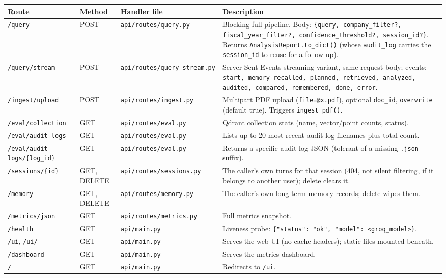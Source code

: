 \documentclass[11pt,a4paper]{report}
\newcommand{\code}[1]{\texttt{#1}}
\newcommand{\file}[1]{\texttt{\small #1}}
\begin{document}
\begin{longtable}{@{}p{2.6cm}p{1.1cm}p{3.6cm}p{6cm}@{}}
\toprule
\textbf{Route} & \textbf{Method} & \textbf{Handler file} & \textbf{Description} \\
\midrule
\endhead
\code{/query} & POST & \file{api/routes/query.py} & Blocking full pipeline. Body:
\code{\{query, company\_filter?, fiscal\_year\_filter?, confidence\_threshold?,
session\_id?\}}. Returns \code{AnalysisReport.to\_dict()} (whose
\code{audit\_log} carries the \code{session\_id} to reuse for a follow-up). \\
\code{/query/stream} & POST & \file{api/routes/query\_stream.py} & Server-Sent-Events
streaming variant, same request body; events: \code{start, memory\_recalled,
planned, retrieved, analyzed, audited, compared, remembered, done, error}. \\
\code{/ingest/upload} & POST & \file{api/routes/ingest.py} & Multipart PDF upload
(\code{file=@x.pdf}), optional \code{doc\_id}, \code{overwrite} (default true).
Triggers \code{ingest\_pdf()}. \\
\code{/eval/collection} & GET & \file{api/routes/eval.py} & Qdrant collection stats
(name, vector/point counts, status). \\
\code{/eval/audit-logs} & GET & \file{api/routes/eval.py} & Lists up to 20 most recent
audit log filenames plus total count. \\
\code{/eval/audit-logs/\{log\_id\}} & GET & \file{api/routes/eval.py} & Returns a
specific audit log JSON (tolerant of a missing \code{.json} suffix). \\
\code{/sessions/\{id\}} & GET, DELETE & \file{api/routes/sessions.py} & The caller's
own turns for that session (404, not silent filtering, if it belongs to another
user); delete clears it. \\
\code{/memory} & GET, DELETE & \file{api/routes/memory.py} & The caller's own
long-term memory records; delete wipes them. \\
\code{/metrics/json} & GET & \file{api/routes/metrics.py} & Full metrics snapshot. \\
\code{/health} & GET & \file{api/main.py} & Liveness probe: \code{\{"status": "ok",
"model": <groq\_model>\}}. \\
\code{/ui}, \code{/ui/} & GET & \file{api/main.py} & Serves the web UI (no-cache
headers); static files mounted beneath. \\
\code{/dashboard} & GET & \file{api/main.py} & Serves the metrics dashboard. \\
\code{/} & GET & \file{api/main.py} & Redirects to \code{/ui}. \\
\bottomrule
\end{longtable}
\end{document}
